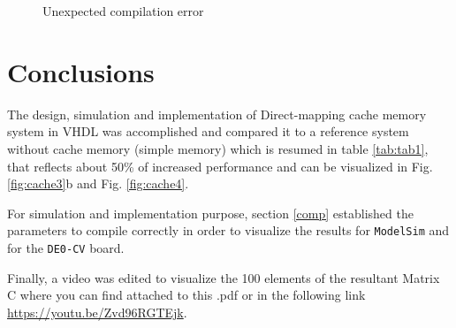 \documentclass[]{article}
\begin{document}
\begin{figure}[H]
	\centering
	\caption{Unexpected compilation error}
	\label{fig:error}
\end{figure}

\section{Conclusions}
The design, simulation and implementation of Direct-mapping cache memory system in VHDL was accomplished and compared it to a reference system without cache memory (simple memory) which is resumed in table \ref{tab:tab1}, that reflects about 50\% of increased performance and can be visualized in Fig. \ref{fig:cache3}b and Fig. \ref{fig:cache4}.
 
\begin{table}[!ht]
	\centering
	\caption{Timing simulation results.}
	\label{tab:tab1}
\end{table}

For simulation and implementation purpose, section \ref{comp} established the parameters to compile correctly in order to visualize the results for \verb|ModelSim| and for the \verb|DE0-CV| board.

Finally, a video was edited to visualize the 100 elements of the resultant Matrix C where you can find attached to this .pdf or in the following link \url{https://youtu.be/Zvd96RGTEjk}.
\end{document}

